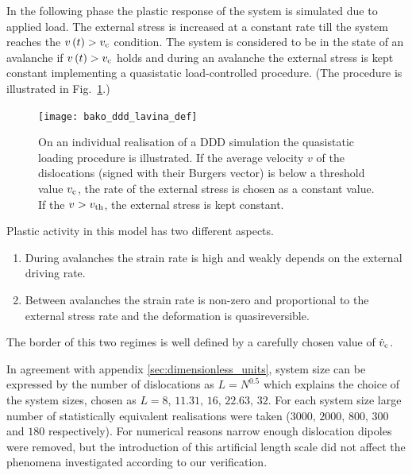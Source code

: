 In the following phase the plastic response of the system is simulated due to applied load. The external stress is increased at a constant rate till the system reaches the $v\left( t \right) > {v_{\rm{c}}}$ condition. The system is considered to be in the state of an avalanche if $v\left( t \right) > {v_{\rm{c}}}$ holds and during an avalanche the external stress is kept constant implementing a quasistatic load-controlled procedure. (The procedure is illustrated in Fig.~\ref{fig:weakest_DDD_lavina_def}.)

  
\begin{figure}[htbp!] 
\centering    
\texttt{[image: bako\_ddd\_lavina\_def]}
\caption[Loading protocol and avalanches in a DDD]{On an individual realisation of a DDD simulation the quasistatic loading procedure is illustrated. If the average velocity $v$ of the dislocations (signed with their Burgers vector) is below a threshold value $v_{{\rm{c}}}$, the rate of the external stress is chosen as a constant value. If the $v>v_{{\rm{th}}}$, the external stress is kept constant.}
\label{fig:weakest_DDD_lavina_def}
\end{figure}

Plastic activity in this model has two different aspects.
\begin{enumerate}
\item During avalanches the strain rate is high and weakly depends on the external driving rate.
\item Between avalanches the strain rate is non-zero and proportional to the external stress rate and the deformation is quasireversible.
\end{enumerate}
The border of this two regimes is well defined by a carefully chosen value of ${{\dot v }_{\rm{c}}}$.

In agreement with appendix \ref{sec:dimensionless_units}, system size can be expressed by the number of dislocations as $L = {N^{0.5}}$ which explains the choice of the system sizes, chosen as $L=8,\,11.31,\,16,\,22.63,\,32$. For each system size large number of statistically equivalent realisations were taken ($3000,\,2000,\,800,\,300$ and $180$ respectively). For numerical reasons narrow enough dislocation dipoles were removed, but the introduction of this artificial length scale did not affect the phenomena investigated according to our verification.



